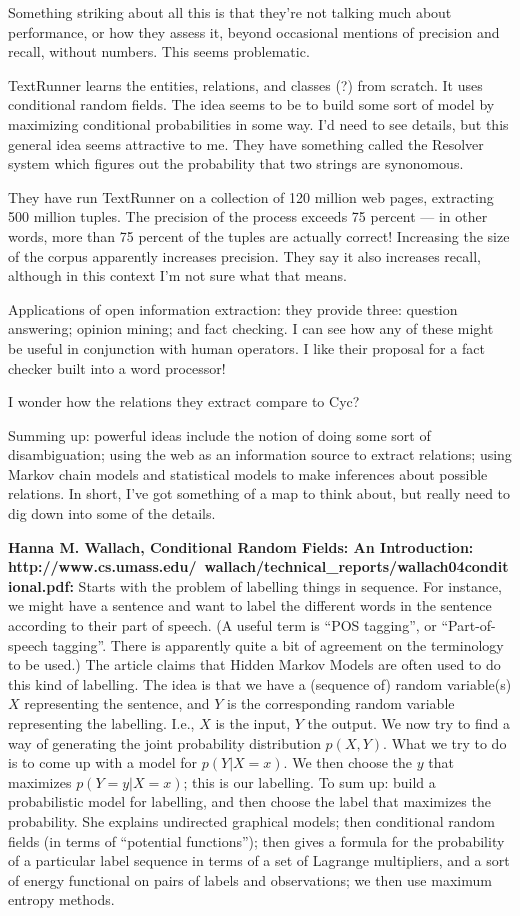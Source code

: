 Something striking about all this is that they're not talking much
about performance, or how they assess it, beyond occasional mentions
of precision and recall, without numbers.  This seems problematic.

TextRunner learns the entities, relations, and classes (?) from
scratch.  It uses conditional random fields.  The idea seems to be to
build some sort of model by maximizing conditional probabilities in
some way.  I'd need to see details, but this general idea seems
attractive to me.  They have something called the Resolver system
which figures out the probability that two strings are synonomous.

They have run TextRunner on a collection of 120 million web pages,
extracting 500 million tuples.  The precision of the process exceeds
75 percent --- in other words, more than 75 percent of the tuples are
actually correct!  Increasing the size of the corpus apparently
increases precision.  They say it also increases recall, although in
this context I'm not sure what that means.

Applications of open information extraction: they provide three:
question answering; opinion mining; and fact checking.  I can see how
any of these might be useful in conjunction with human operators.  I
like their proposal for a fact checker built into a word processor!

I wonder how the relations they extract compare to Cyc?

Summing up: powerful ideas include the notion of doing some sort of
disambiguation; using the web as an information source to extract
relations; using Markov chain models and statistical models to make
inferences about possible relations.  In short, I've got something of
a map to think about, but really need to dig down into some of the
details.

\textbf{Hanna M. Wallach, Conditional Random Fields: An Introduction:
  http://www.cs.umass.edu/~wallach/technical_reports/wallach04conditional.pdf:}
Starts with the problem of labelling things in sequence.  For
instance, we might have a sentence and want to label the different
words in the sentence according to their part of speech.  (A useful
term is ``POS tagging'', or ``Part-of-speech tagging''.  There is
apparently quite a bit of agreement on the terminology to be used.)
The article claims that Hidden Markov Models are often used to do this
kind of labelling.  The idea is that we have a (sequence of) random
variable(s) $X$ representing the sentence, and $Y$ is the
corresponding random variable representing the labelling.  I.e., $X$
is the input, $Y$ the output.  We now try to find a way of generating
the joint probability distribution $p(X,Y)$.  What we try to do is to
come up with a model for $p(Y|X=x)$.  We then choose the $y$ that
maximizes $p(Y=y|X=x)$; this is our labelling.  To sum up: build a
probabilistic model for labelling, and then choose the label that
maximizes the probability.  She explains undirected graphical models;
then conditional random fields (in terms of ``potential functions'');
then gives a formula for the probability of a particular label
sequence in terms of a set of Lagrange multipliers, and a sort of
energy functional on pairs of labels and observations; we then use
maximum entropy methods.  

